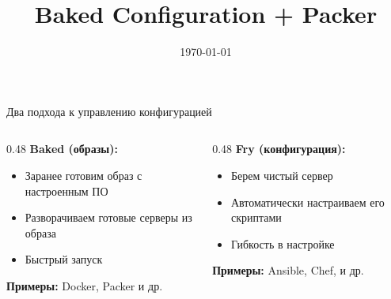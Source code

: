 \documentclass[aspectratio=169]{beamer}
\title{Baked Configuration + Packer}
\date{\today}
\begin{document}
    \maketitle

    \begin{frame}{Два подхода к управлению конфигурацией}
        \begin{columns}[t]
            \begin{column}[t]{0.48\textwidth}
                \textbf{Baked (образы):}
                \begin{itemize}
                    \item Заранее готовим образ с настроенным ПО
                    \item Разворачиваем готовые серверы из образа
                    \item Быстрый запуск
                \end{itemize}
                
                \vspace{0.3cm}
                \textbf{Примеры:} Docker, Packer и др.
            \end{column}
            
            \begin{column}[t]{0.48\textwidth}
                \textbf{Fry (конфигурация):}
                \begin{itemize}
                    \item Берем чистый сервер
                    \item Автоматически настраиваем его скриптами
                    \item Гибкость в настройке
                \end{itemize}
                
                \vspace{0.3cm}
                \textbf{Примеры:} Ansible, Chef, и др.
            \end{column}
        \end{columns}
        
    \end{frame}
\end{document}
